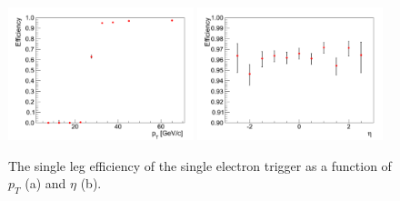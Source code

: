 \begin{figure}[!h]
\begin{center}
\includegraphics[width=0.48\textwidth]{figures/ElectronTriggerEffVsPt_Ele27Tight.pdf}
\includegraphics[width=0.48\textwidth]{figures/ElectronTriggerEffVsEta_Ele27Tight.pdf}
\end{center}
\caption{The single leg efficiency of the single electron trigger as a function of $p_{T}$ (a) and $\eta$ (b).}
\label{fig:Ele27Efficiency}
\end{figure}












